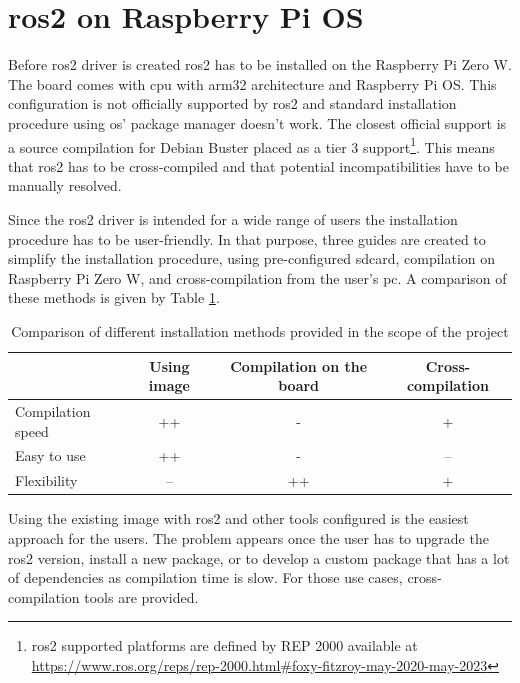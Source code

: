 \section{\ac{ros2} on Raspberry Pi OS}
Before \ac{ros2} driver is created \ac{ros2} has to be installed on the Raspberry Pi Zero W. The board comes with \ac{cpu} with arm32 architecture and Raspberry Pi OS. This configuration is not officially supported by \ac{ros2} and standard installation procedure using \acs{os}' package manager doesn't work. The closest official support is a source compilation for Debian Buster placed as a tier 3 support\footnote{\ac{ros2} supported platforms are defined by REP 2000 available at \url{https://www.ros.org/reps/rep-2000.html\#foxy-fitzroy-may-2020-may-2023}}. This means that \ac{ros2} has to be cross-compiled and that potential incompatibilities have to be manually resolved.

Since the \ac{ros2} driver is intended for a wide range of users the installation procedure has to be user-friendly. In that purpose, three guides are created to simplify the installation procedure, using pre-configured \ac{sdcard}, compilation on Raspberry Pi Zero W, and cross-compilation from the user's \ac{pc}. A comparison of these methods is given by Table \ref{tab:physical:installation}.

\begin{table}[H]
    \begin{adjustwidth}{-1.5in}{-1.5in}
    \centering
    \begin{tabular}{|l|c|c|c|}
        \hline
        & \textbf{Using image} & \textbf{Compilation on the board} & \textbf{Cross-compilation} \\
        \hline
        Compilation speed & ++ & - & + \\
        \hline
        Easy to use & ++ & - & -- \\
        \hline
        Flexibility & -- & ++ & + \\
        \hline
    \end{tabular}
    \caption{Comparison of different installation methods provided in the scope of the project}
    \label{tab:physical:installation}
    \end{adjustwidth}
\end{table}

Using the existing image with \ac{ros2} and other tools configured is the easiest approach for the users. The problem appears once the user has to upgrade the \ac{ros2} version, install a new package, or to develop a custom package that has a lot of dependencies as compilation time is slow. For those use cases, cross-compilation tools are provided.

